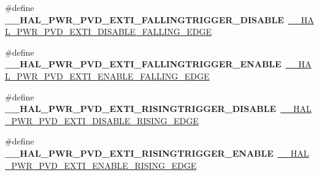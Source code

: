 \begin{DoxyCompactItemize}
\item 
\mbox{\label{group___h_a_l___p_w_r___aliased___macros_gaeccf45c0c61b98bd212bd7cf905c65fd}} 
\#define {\bfseries \+\_\+\+\_\+\+H\+A\+L\+\_\+\+P\+W\+R\+\_\+\+P\+V\+D\+\_\+\+E\+X\+T\+I\+\_\+\+F\+A\+L\+L\+I\+N\+G\+T\+R\+I\+G\+G\+E\+R\+\_\+\+D\+I\+S\+A\+B\+LE}~\mbox{\hyperlink{group___p_w_r___exported___macro_ga1ca57168205f8cd8d1014e6eb9465f2d}{\+\_\+\+\_\+\+H\+A\+L\+\_\+\+P\+W\+R\+\_\+\+P\+V\+D\+\_\+\+E\+X\+T\+I\+\_\+\+D\+I\+S\+A\+B\+L\+E\+\_\+\+F\+A\+L\+L\+I\+N\+G\+\_\+\+E\+D\+GE}}
\item 
\mbox{\label{group___h_a_l___p_w_r___aliased___macros_ga03036e3fb46ad3933576789d7d7290e5}} 
\#define {\bfseries \+\_\+\+\_\+\+H\+A\+L\+\_\+\+P\+W\+R\+\_\+\+P\+V\+D\+\_\+\+E\+X\+T\+I\+\_\+\+F\+A\+L\+L\+I\+N\+G\+T\+R\+I\+G\+G\+E\+R\+\_\+\+E\+N\+A\+B\+LE}~\mbox{\hyperlink{group___p_w_r___exported___macro_ga5b971478563a00e1ee1a9d8ca8054e08}{\+\_\+\+\_\+\+H\+A\+L\+\_\+\+P\+W\+R\+\_\+\+P\+V\+D\+\_\+\+E\+X\+T\+I\+\_\+\+E\+N\+A\+B\+L\+E\+\_\+\+F\+A\+L\+L\+I\+N\+G\+\_\+\+E\+D\+GE}}
\item 
\mbox{\label{group___h_a_l___p_w_r___aliased___macros_gadc23ac66f1b8c429fe2bf6727220cfea}} 
\#define {\bfseries \+\_\+\+\_\+\+H\+A\+L\+\_\+\+P\+W\+R\+\_\+\+P\+V\+D\+\_\+\+E\+X\+T\+I\+\_\+\+R\+I\+S\+I\+N\+G\+T\+R\+I\+G\+G\+E\+R\+\_\+\+D\+I\+S\+A\+B\+LE}~\mbox{\hyperlink{group___p_w_r___exported___macro_ga1ca8fd7f3286a176f6be540c75a004c6}{\+\_\+\+\_\+\+H\+A\+L\+\_\+\+P\+W\+R\+\_\+\+P\+V\+D\+\_\+\+E\+X\+T\+I\+\_\+\+D\+I\+S\+A\+B\+L\+E\+\_\+\+R\+I\+S\+I\+N\+G\+\_\+\+E\+D\+GE}}
\item 
\mbox{\label{group___h_a_l___p_w_r___aliased___macros_ga90e56e3a788760b51a22ffbbf52bb977}} 
\#define {\bfseries \+\_\+\+\_\+\+H\+A\+L\+\_\+\+P\+W\+R\+\_\+\+P\+V\+D\+\_\+\+E\+X\+T\+I\+\_\+\+R\+I\+S\+I\+N\+G\+T\+R\+I\+G\+G\+E\+R\+\_\+\+E\+N\+A\+B\+LE}~\mbox{\hyperlink{group___p_w_r___exported___macro_ga7bef3f30c9fe267c99d5240fbf3f878c}{\+\_\+\+\_\+\+H\+A\+L\+\_\+\+P\+W\+R\+\_\+\+P\+V\+D\+\_\+\+E\+X\+T\+I\+\_\+\+E\+N\+A\+B\+L\+E\+\_\+\+R\+I\+S\+I\+N\+G\+\_\+\+E\+D\+GE}}
\item 
\mbox{\label{group___h_a_l___p_w_r___aliased___macros_ga14336c482ff10c368ab9b7bbf1873894}} 

\end{DoxyCompactItemize}
